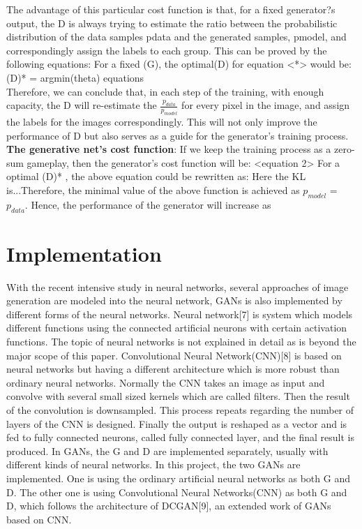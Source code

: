 \documentclass[10pt,twocolumn,letterpaper]{article}
\begin{document}
The advantage of this particular cost function is that, for a fixed generator?s output, the D is always trying to estimate the ratio between the probabilistic distribution of the data samples pdata and the generated samples, pmodel, and correspondingly assign the labels to each group. This can be proved by the following equations:
For a fixed (G), the optimal(D) for equation <*> would be:
 		(D)* = argmin(theta) equations ~\\
		
Therefore, we can conclude that, in each step of the training, with enough capacity, the D will re-estimate the $\frac{p_{data}}{p_{model}}$ for every pixel in the image, and assign the labels for the images correspondingly.  This will not only improve the performance of D but also serves as a guide for the generator's training process.\\

\textbf{The generative net's cost function}:
If we keep the training process as a zero-sum gameplay, then the generator's cost function will be:
<equation 2> 
For a optimal (D)* , the above equation could be rewritten as:
Here the KL is...Therefore, the minimal value of the above function is achieved as $p_{model}$ = $p_{data}$. Hence, the performance of the generator will increase as   

\section{Implementation}
With the recent intensive study in neural networks, several approaches of image generation are modeled into the neural network, GANs is also implemented by different forms of the neural networks. 
Neural network[7] is system which models different functions using the connected artificial neurons with certain activation functions. The topic of neural networks is not explained in detail as is beyond the major scope of this paper. Convolutional Neural Network(CNN)[8] is based on neural networks but having a different architecture which is more robust than ordinary neural networks. Normally the CNN takes an image as input and convolve with several small sized kernels which are called filters. Then the result of the convolution is downsampled. This process repeats regarding the number of layers of the CNN is designed. Finally the output is reshaped as a vector and is fed to fully connected neurons, called fully connected layer, and the final result is produced.
In GANs, the G and D are implemented separately, usually with different kinds of neural networks. In this project, the two GANs are implemented. One is using the ordinary artificial neural networks as both G and D. The other one is using Convolutional Neural Networks(CNN) as both G and D, which follows the architecture of DCGAN[9], an extended work of GANs based on CNN.
\end{document}
